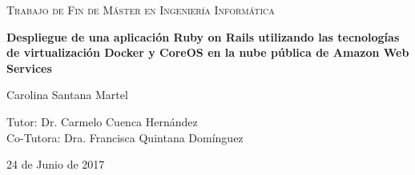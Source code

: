 \begin{titlepage}
	\centering
	\begin{figure}[H]
        \centering
	\end{figure}\par\vspace{1cm}
	{\scshape\Large Trabajo de Fin de Máster en Ingeniería Informática\par}
	\vspace{1.5cm}
	{\huge\bfseries Despliegue de una aplicación Ruby on Rails utilizando las tecnologías de virtualización Docker y CoreOS en la nube pública de Amazon Web Services\par}
	\vspace{2.5cm}
	{\Large Carolina Santana Martel\par}
	\vspace{1.5cm}
	\large Tutor: Dr. Carmelo Cuenca Hernández \\
        \vspace{0.5cm}
	\large Co-Tutora: Dra. Francisca Quintana Domínguez \\ 
        \vspace{1.5cm}
	{\large 24 de Junio de 2017\par}
\end{titlepage}

